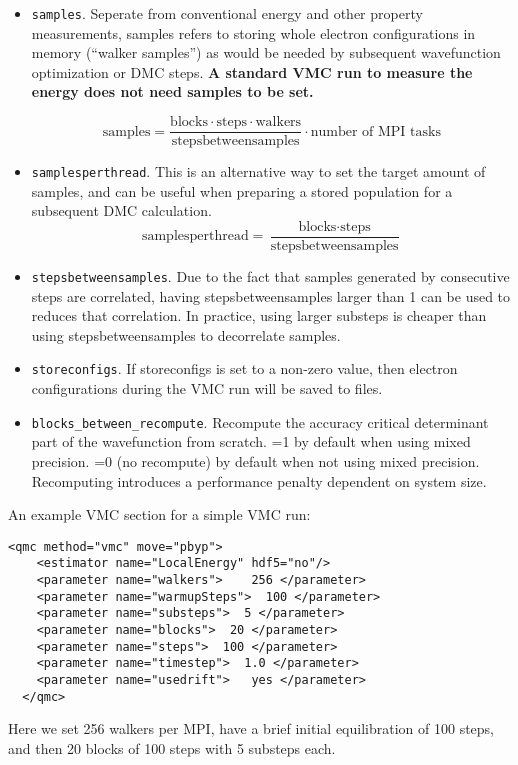 \begin{itemize}
\item \texttt{samples}. Seperate from conventional energy and other
  property measurements, samples refers to storing whole electron
  configurations in memory (``walker samples'') as would be needed by subsequent
  wavefunction optimization or DMC steps. \textbf{A standard VMC run to
  measure the energy does not need samples to be set.}

\[
\textrm{samples}=
\frac{\textrm{blocks}\cdot\textrm{steps}\cdot\textrm{walkers}}{\textrm{stepsbetweensamples}}\cdot\textrm{number of MPI tasks}
\]

\item \texttt{samplesperthread}. This is an alternative way to set the target amount of samples, and can be useful when preparing a stored population for a subsequent DMC calculation.
\[
\textrm{samplesperthread}=
\frac{\textrm{blocks}\cdot\textrm{steps}}{\textrm{stepsbetweensamples}}
\]

\item \texttt{stepsbetweensamples}. Due to the fact that samples generated by consecutive steps are correlated, having stepsbetweensamples larger than 1 can be used to reduces that correlation. In practice, using larger substeps is cheaper than using stepsbetweensamples to decorrelate samples. 

\item \texttt{storeconfigs}. If storeconfigs is set to a non-zero value, then electron configurations during the VMC run will be saved to files.

\item \texttt{blocks\_between\_recompute}. Recompute the accuracy critical determinant part of the wavefunction
  from scratch. =1 by default when using mixed precision. =0 (no
  recompute) by default when not using mixed precision. Recomputing
  introduces a performance penalty dependent on system size.
\end{itemize}

An example VMC section for a simple VMC run:
\begin{lstlisting}[style=XML]
  <qmc method="vmc" move="pbyp">
    <estimator name="LocalEnergy" hdf5="no"/>
    <parameter name="walkers">    256 </parameter>
    <parameter name="warmupSteps">  100 </parameter>
    <parameter name="substeps">  5 </parameter>
    <parameter name="blocks">  20 </parameter>
    <parameter name="steps">  100 </parameter>
    <parameter name="timestep">  1.0 </parameter>
    <parameter name="usedrift">   yes </parameter>
  </qmc>
\end{lstlisting}
Here we set 256 walkers per MPI, have a brief initial equilibration of 100 steps, and then 20 blocks of 100 steps with 5 substeps each.

